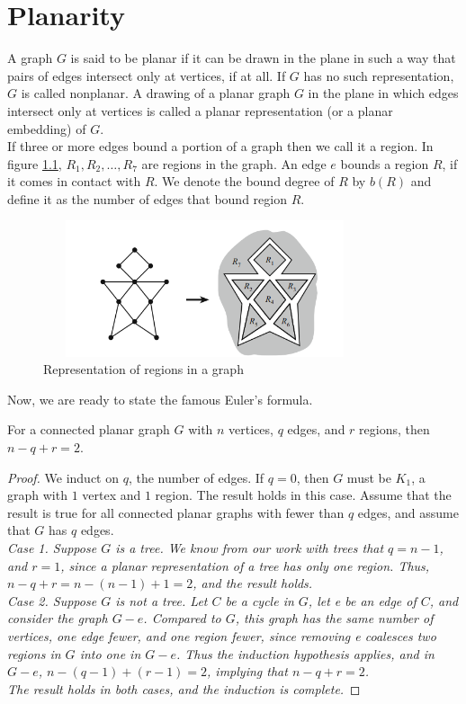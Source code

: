 \chapter{Planarity}

A graph $G$ is said to be planar if it can be drawn in the plane in such a way that pairs of edges intersect only at vertices, if at all. If $G$ has no such representation, $G$ is called nonplanar. A drawing of a planar graph $G$ in the plane in which edges intersect only at vertices is called a planar representation (or a planar embedding) of $G$.\\

If three or more edges bound a portion of a graph then we call it a region. In figure \ref{fig:regions}, $R_1, R_2, \dots, R_7$ are regions in the graph. An edge $e$ bounds a region $R$, if it comes in contact with $R$. We denote the bound degree of $R$ by $b(R)$ and define it as the number of edges that bound region $R$.

\begin{figure}[hbt!]
    \label{fig:regions}
    \centering
    \includegraphics[height=4cm,width=9.5cm]{images/region.png}
    \caption{Representation of regions in a graph}
\end{figure}

Now, we are ready to state the famous Euler's formula.
\begin{thm}
    For a connected planar graph $G$ with $n$ vertices, $q$ edges, and $r$ regions, then $n-q+r=2$.
\end{thm}
\begin{proof}
    We induct on $q$, the number of edges. If $q = 0$, then $G$ must be $K_1$, a graph with $1$ vertex and $1$ region. The result holds in this case. Assume that the result is true for all connected planar graphs with fewer than $q$ edges, and assume that $G$ has $q$ edges.\\
    \em{Case 1.} Suppose $G$ is a tree. We know from our work with trees that $q = n-1$, and $r = 1$, since a planar representation of a tree has only one region. Thus, $n - q + r = n - (n - 1) + 1 = 2$, and the result holds.\\
    \em{Case 2.} Suppose $G$ is not a tree. Let $C$ be a cycle in $G$, let e be an edge of $C$, and consider the graph $G - e$. Compared to $G$, this graph has the same number of vertices, one edge fewer, and one region fewer, since removing e coalesces two regions in $G$ into one in $G - e$. Thus the induction hypothesis applies, and in $G - e$, $n - (q - 1) + (r - 1) = 2$, implying that $n - q + r = 2$.\\
    The result holds in both cases, and the induction is complete.
\end{proof}

